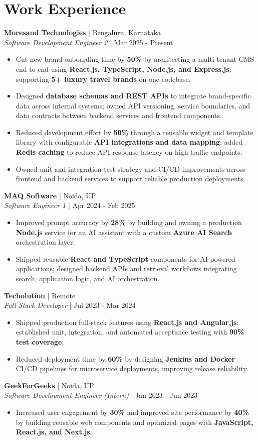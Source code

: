 \documentclass[a4paper,10pt]{article}
\newcommand{\role}[4]{\textbf{#1} | #2\\\textit{#3} | #4\par}
\begin{document}
\section{Work Experience}
\role{Moresand Technologies}{Bengaluru, Karnataka}{Software Development Engineer 2}{Mar 2025 - Present}
\begin{itemize}
\item Cut new-brand onboarding time by \textbf{50\%} by architecting a multi-tenant CMS end to end using \textbf{React.js, TypeScript, Node.js, and Express.js}, supporting \textbf{5+ luxury travel brands} on one codebase.
\item Designed \textbf{database schemas and REST APIs} to integrate brand-specific data across internal systems; owned API versioning, service boundaries, and data contracts between backend services and frontend components.
\item Reduced development effort by \textbf{50\%} through a reusable widget and template library with configurable \textbf{API integrations and data mapping}; added \textbf{Redis caching} to reduce API response latency on high-traffic endpoints.
\item Owned unit and integration test strategy and CI/CD improvements across frontend and backend services to support reliable production deployments.
\end{itemize}
\role{MAQ Software}{Noida, UP}{Software Engineer 1}{Apr 2024 - Feb 2025}
\begin{itemize}
\item Improved prompt accuracy by \textbf{28\%} by building and owning a production \textbf{Node.js} service for an AI assistant with a custom \textbf{Azure AI Search} orchestration layer.
\item Shipped reusable \textbf{React and TypeScript} components for AI-powered applications; designed backend APIs and retrieval workflows integrating search, application logic, and AI orchestration.
\end{itemize}
\role{Techolution}{Remote}{Full Stack Developer}{Jul 2023 - Mar 2024}
\begin{itemize}
\item Shipped production full-stack features using \textbf{React.js and Angular.js}; established unit, integration, and automated acceptance testing with \textbf{90\% test coverage}.
\item Reduced deployment time by \textbf{60\%} by designing \textbf{Jenkins and Docker} CI/CD pipelines for microservice deployments, improving release reliability.
\end{itemize}
\role{GeekForGeeks}{Noida, UP}{Software Development Engineer (Intern)}{Jan 2023 - Jun 2023}
\begin{itemize}
\item Increased user engagement by \textbf{30\%} and improved site performance by \textbf{40\%} by building reusable web components and optimized pages with \textbf{JavaScript, React.js, and Next.js}.
\end{itemize}
\end{document}
